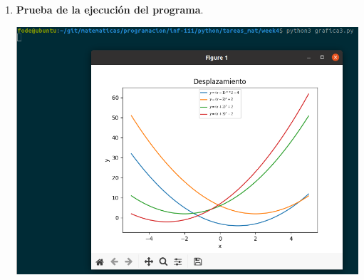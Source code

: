 \begin{enumerate}
\begin{enumerate}[\bfseries a)]
	\item \textbf{Prueba de la ejecución del programa}.\\
	    \begin{center}
		\includegraphics[scale=.35]{imagenes/tareas_mat/week4/grafica3.png}
	    \end{center}

    \end{enumerate}

\newpage
\end{enumerate}
